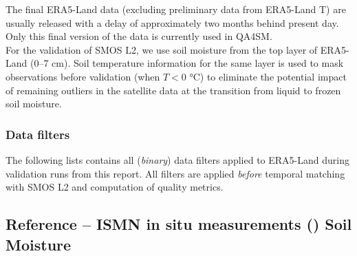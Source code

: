The final ERA5-Land data (excluding preliminary data from ERA5-Land T) are usually released with a delay of approximately two months behind present day.
Only this final version of the data is currently used in \ac{QA4SM}.
\\[1em]
For the validation of \ac{SMOS} \ac{L2}, we use soil moisture from the top layer of ERA5-Land (0–7 cm).
Soil temperature information for the same layer is used to mask observations before validation (when $T < 0$ °C) to eliminate the potential impact of remaining outliers in the satellite data at the transition from liquid to frozen soil moisture.

\subsubsection{Data filters}

The following lists contains all (\textit{binary}) data filters applied to ERA5-Land during validation runs from this report.
All filters are applied \textit{before} temporal matching with \ac{SMOS} \ac{L2} and computation of quality metrics.

\begin{itemize}
\end{itemize}


\subsection{Reference -- ISMN in situ measurements () Soil Moisture} \label{ssec:ismn}


